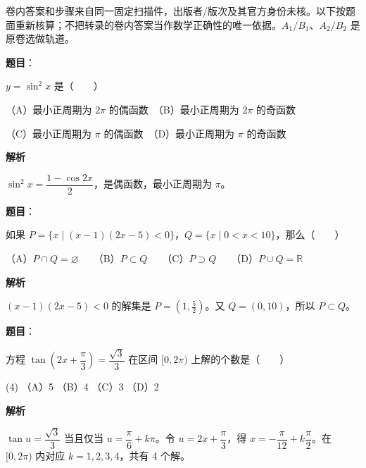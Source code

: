

\begin{gktip}
卷内答案和步骤来自同一固定扫描件，出版者/版次及其官方身份未核。以下按题面重新核算；不把转录的卷内答案当作数学正确性的唯一依据。$A_1/B_1$、$A_2/B_2$ 是原卷选做轨道。
\end{gktip}


\begin{answer}

\textbf{题目}：

$y=\sin^2x$ 是\mbox{（　　）}

（A）最小正周期为 $2\pi$ 的偶函数　（B）最小正周期为 $2\pi$ 的奇函数

（C）最小正周期为 $\pi$ 的偶函数　（D）最小正周期为 $\pi$ 的奇函数

\textbf{解析}

$\sin^2x=\dfrac{1-\cos2x}{2}$，是偶函数，最小正周期为 $\pi$。


\end{answer}
\begin{answer}

\textbf{题目}：

如果 $P=\{x\mid(x-1)(2x-5)<0\}$，$Q=\{x\mid0<x<10\}$，那么\mbox{（　　）}

（A）$P\cap Q=\varnothing$　　（B）$P\subset Q$　　（C）$P\supset Q$　　（D）$P\cup Q=\mathbb R$

\textbf{解析}

$(x-1)(2x-5)<0$ 的解集是 $P=(1,\frac52)$。又 $Q=(0,10)$，所以 $P\subset Q$。


\end{answer}
\begin{answer}

\textbf{题目}：

方程 $\tan\left(2x+\dfrac\pi3\right)=\dfrac{\sqrt3}{3}$ 在区间 $[0,2\pi)$ 上解的个数是\mbox{（　　）}

\begin{gkopts}(4)
\task （A）5
\task （B）4
\task （C）3
\task （D）2
\end{gkopts}

\textbf{解析}

$\tan u=\dfrac{\sqrt3}{3}$ 当且仅当 $u=\dfrac\pi6+k\pi$。令 $u=2x+\dfrac\pi3$，得 $x=-\dfrac\pi{12}+k\dfrac\pi2$。在 $[0,2\pi)$ 内对应 $k=1,2,3,4$，共有 4 个解。


\end{answer}
